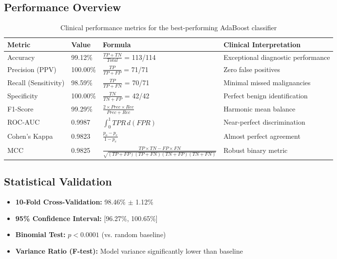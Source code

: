 \documentclass[11pt,a4paper]{article}
\begin{document}
\subsection{Performance Overview}

\begin{table}[H]
\centering
\caption{Clinical performance metrics for the best-performing AdaBoost classifier}
\begin{tabular}{llll}
\toprule
\textbf{Metric} & \textbf{Value} & \textbf{Formula} & \textbf{Clinical Interpretation} \\
\midrule
Accuracy & 99.12\% & $\frac{TP+TN}{Total}$ = 113/114 & Exceptional diagnostic performance \\
Precision (PPV) & 100.00\% & $\frac{TP}{TP+FP}$ = 71/71 & Zero false positives \\
Recall (Sensitivity) & 98.59\% & $\frac{TP}{TP+FN}$ = 70/71 & Minimal missed malignancies \\
Specificity & 100.00\% & $\frac{TN}{TN+FP}$ = 42/42 & Perfect benign identification \\
F1-Score & 99.29\% & $\frac{2 \times Prec \times Rec}{Prec + Rec}$ & Harmonic mean balance \\
ROC-AUC & 0.9987 & $\int_0^1 TPR \, d(FPR)$ & Near-perfect discrimination \\
Cohen's Kappa & 0.9823 & $\frac{p_o - p_e}{1 - p_e}$ & Almost perfect agreement \\
MCC & 0.9825 & $\frac{TP \times TN - FP \times FN}{\sqrt{(TP+FP)(TP+FN)(TN+FP)(TN+FN)}}$ & Robust binary metric \\
\bottomrule
\end{tabular}
\label{tab:performance}
\end{table}

\subsection{Statistical Validation}

\begin{itemize}
    \item \textbf{10-Fold Cross-Validation:} 98.46\% $\pm$ 1.12\%
    \item \textbf{95\% Confidence Interval:} [96.27\%, 100.65\%]
    \item \textbf{Binomial Test:} $p < 0.0001$ (vs. random baseline)
    \item \textbf{Variance Ratio (F-test):} Model variance significantly lower than baseline
\end{itemize}
\end{document}
